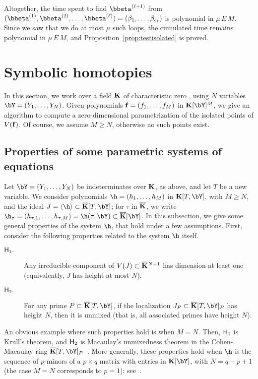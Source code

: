 \documentclass[12pt]{article}
\begin{document}
Altogether, the time spent to find $\bbeta^{(\ell+1)}$ from
$(\bbeta^{(1)},\bbeta^{(2)},\dots,\bbeta^{(\ell)})=(\beta_{1},\dots,\beta_{e_\ell})$
is polynomial in $\mu\,E\,M$. Since we saw that we do at most $\mu$
such loops, the cumulated time remains polynomial in $\mu\,E\,M$, and
Proposition~\ref{prop:testisolated} is proved.


\section{Symbolic homotopies}

In this section, we work over a field $\mathbf{K}$ of characteristic zero
, using $N$ variables $\bY=(Y_1,\dots,Y_N)$. Given
polynomials $\mathbf{f}=(f_1,\dots,f_M)$ in $\KK[\bY]^M$, we give an algorithm
to compute a zero-dimensional parametrization of the isolated points
of $V(\mathbf{f})$. Of course, we assume $M\ge N$, otherwise no such points
exist.


\subsection{Properties of some parametric systems of equations}

Let $\bY=(Y_1,\dots,Y_N)$ be indeterminates over $\mathbf{K}$, as above, and
let $T$ be a new variable. We consider polynomials
$\h=(h_1,\dots,h_M)$ in $\KK[T,\bY]$, with $M \ge N$, and the ideal $J=\langle \h
\rangle \subset \KKbar[T,\bY]$; for $\tau$ in $\overline{\mathbf{K}}$, we write
$\h_\tau=(h_{\tau,1},\dots,h_{\tau,M})=\h(\tau,\bY)\subset
\KKbar[\bY]$. In this subsection, we give some general properties of
the system $\h$, that hold under a few assumptions.  First, consider
the following properties related to the system $\h$ itself.
\begin{description}
\item[${\sf H}_1.$] Any irreducible component of $V(J) \subset
  \overline{\mathbf{K}}{}^{N+1}$ has dimension at least one (equivalently, $J$ has
  height at most $N$).
\item[${\sf H}_2.$] For any prime $P \subset\KKbar[T,\bY]$, if the
  localization $J_P \subset \KKbar[T,\bY]_P$ has height $N$, then it is
  unmixed (that is, all associated primes have height $N$).
\end{description}
An obvious example where such properties hold is when $M=N$. Then,
${\sf H}_1$ is Krull's theorem, and ${\sf H}_2$ is Macaulay's
unmixedness theorem in the Cohen-Macaulay ring
$\KKbar[T,\bY]_P$~\cite[Corollary~18.14]{Eisenbud95}. More generally,
these properties hold when $\h$ is the sequence of $p$-minors of 
a $p \times q$ matrix with entries in $\KK[\bY]$, with $N=q-p+1$ 
(the case $M=N$ corresponds to $p=1$); see~\cite[Section~6]{EN62}.
\end{document}
